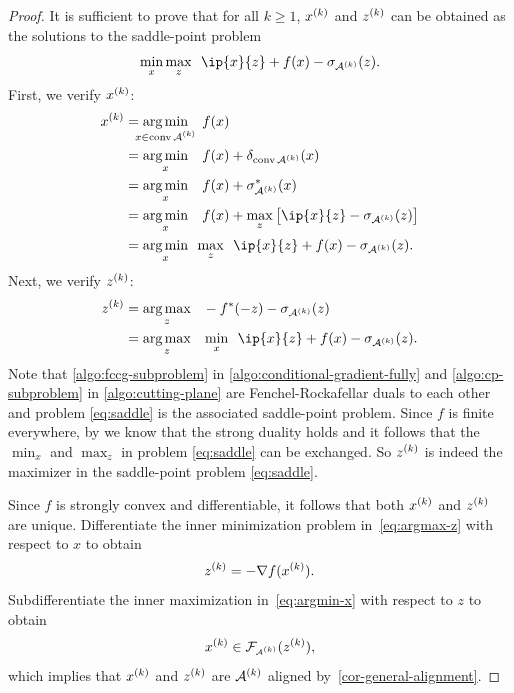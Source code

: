 \begin{proof}
  It is sufficient to prove that for all $k\geq1$, $x^{(k)}$ and $z^{(k)}$ can be
  obtained as the solutions to the saddle-point problem
  \begin{equation} \label{eq:saddle}
    \min_{x}\max_{z}\enspace \ip{x}{z} + f(x) -  \sigma_{\Ascr\k}(z).
  \end{equation}
  First, we verify $x^{(k)}$:
  \begin{align}
  x\k &= \argmin{\mathclap{x \in \conv\Ascr\k}}\enspace f(x)\nonumber
      \\&= \argmin{x}\enspace f(x) + \delta_{\conv\Ascr\k}(x)\nonumber
      \\&= \argmin{x}\enspace f(x) + \sigma_{\Ascr\k}^*(x)\nonumber
      \\&= \argmin{x}\enspace f(x) + \max_{z}\big[\ip{x}{z} - \sigma_{\Ascr\k}(z)\big]\nonumber
      \\&= \argmin{x} \max_{z}\enspace\ip{x}{z} + f(x) - \sigma_{\Ascr\k}(z)\label{eq:argmin-x}.
  \end{align}
  Next, we verify $z^{(k)}$:
  \begin{align}
  z\k
      &=\argmax{z}\ -f^*(-z) - \sigma_{\Ascr\k}(z)\nonumber
    \\&=\argmax{z}\ \min_{x} \enspace \ip{x}{z} + f(x) - \sigma_{\Ascr\k}(z)\label{eq:argmax-z}.
  \end{align}
  Note that \autoref{algo:fccg-subproblem} in \autoref{algo:conditional-gradient-fully} and \autoref{algo:cp-subproblem} in \autoref{algo:cutting-plane} are Fenchel-Rockafellar duals to each other and problem \eqref{eq:saddle} is the associated saddle-point problem. Since $f$ is finite everywhere, by \cite[Theorem~31.1]{rockafellar1970convex} we know that the strong duality holds and it follows that the $\min_x$ and $\max_z$ in problem \eqref{eq:saddle} can be exchanged. So $z^{(k)}$ is indeed the maximizer in the saddle-point problem \eqref{eq:saddle}. 

  Since $f$ is strongly convex and differentiable, it follows that both $x^{(k)}$ and $z^{(k)}$ are unique. Differentiate the inner minimization problem in~\eqref{eq:argmax-z} with
  respect to $x$ to obtain 
  \[z^{(k)} = -\nabla f(x^{(k)}).\]
  Subdifferentiate the inner maximization in~\eqref{eq:argmin-x} with respect to $z$ to obtain
  \[x^{(k)} \in \mathcal{F}_{\scriptscriptstyle \mathcal{A}^{(k)}}(z^{(k)}),\] which implies that $x^{(k)}$ and $z^{(k)}$
  are $\mathcal{A}^{(k)}$ aligned by~\autoref{cor-general-alignment}. 
\end{proof} 

